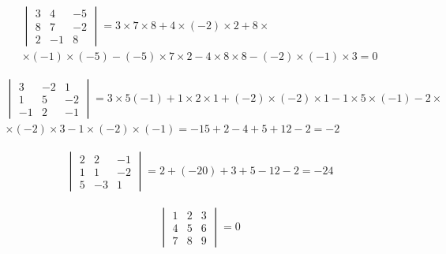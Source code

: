 \documentclass[a4paper, 11pt, oneside]{article}
\begin{document}


\begin{gather*}
	\begin{vmatrix}
		3& 4& -5\\
		8& 7& -2\\
		2& -1& 8
	\end{vmatrix}
	=3\times 7\times 8+4\times (-2)\times 2+8
	\times\\\times
	(-1)\times (-5)-(-5)\times 7\times 2-4\times 8\times 8-(-2)\times (-1)\times 3=0
\end{gather*}


\begin{gather*}
	\begin{vmatrix}
		3& -2& 1\\
		1& 5& -2\\
		-1& 2& -1
	\end{vmatrix}
	=3\times5(-1)+1\times2\times1+(-2)\times(-2)\times1-1\times5\times(-1)-2
	\times\\\times
	(-2)\times3-1\times(-2)\times(-1)=-15+2-4+5+12-2=-2
\end{gather*}

\begin{gather*}
	\begin{vmatrix}
		2& 2& -1\\
		1& 1& -2\\
		5& -3& 1
	\end{vmatrix}
	=2+(-20)+3+5-12-2=-24
\end{gather*}

\begin{gather*} %
	\begin{vmatrix}
		1& 2& 3\\
		4& 5& 6\\
		7& 8& 9
	\end{vmatrix}
	=0
\end{gather*}
\end{document}
